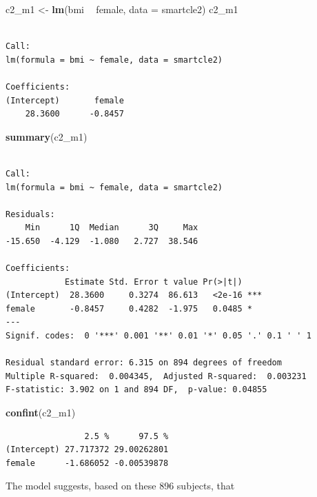 \documentclass[]{book}
\newenvironment{Shaded}{\begin{snugshade}}{\end{snugshade}}
\newcommand{\KeywordTok}[1]{\textcolor[rgb]{0.13,0.29,0.53}{\textbf{#1}}}
\newcommand{\DataTypeTok}[1]{\textcolor[rgb]{0.13,0.29,0.53}{#1}}
\newcommand{\StringTok}[1]{\textcolor[rgb]{0.31,0.60,0.02}{#1}}
\newcommand{\OperatorTok}[1]{\textcolor[rgb]{0.81,0.36,0.00}{\textbf{#1}}}
\newcommand{\NormalTok}[1]{#1}
\theoremstyle{definition}
\theoremstyle{definition}
\theoremstyle{definition}
\theoremstyle{remark}
\begin{document}
\begin{Shaded}
\begin{Highlighting}[]
\NormalTok{c2_m1 <-}\StringTok{ }\KeywordTok{lm}\NormalTok{(bmi }\OperatorTok{~}\StringTok{ }\NormalTok{female, }\DataTypeTok{data =}\NormalTok{ smartcle2)}
\NormalTok{c2_m1}
\end{Highlighting}
\end{Shaded}

\begin{verbatim}

Call:
lm(formula = bmi ~ female, data = smartcle2)

Coefficients:
(Intercept)       female  
    28.3600      -0.8457  
\end{verbatim}

\begin{Shaded}
\begin{Highlighting}[]
\KeywordTok{summary}\NormalTok{(c2_m1)}
\end{Highlighting}
\end{Shaded}

\begin{verbatim}

Call:
lm(formula = bmi ~ female, data = smartcle2)

Residuals:
    Min      1Q  Median      3Q     Max 
-15.650  -4.129  -1.080   2.727  38.546 

Coefficients:
            Estimate Std. Error t value Pr(>|t|)    
(Intercept)  28.3600     0.3274  86.613   <2e-16 ***
female       -0.8457     0.4282  -1.975   0.0485 *  
---
Signif. codes:  0 '***' 0.001 '**' 0.01 '*' 0.05 '.' 0.1 ' ' 1

Residual standard error: 6.315 on 894 degrees of freedom
Multiple R-squared:  0.004345,  Adjusted R-squared:  0.003231 
F-statistic: 3.902 on 1 and 894 DF,  p-value: 0.04855
\end{verbatim}

\begin{Shaded}
\begin{Highlighting}[]
\KeywordTok{confint}\NormalTok{(c2_m1)}
\end{Highlighting}
\end{Shaded}

\begin{verbatim}
                2.5 %      97.5 %
(Intercept) 27.717372 29.00262801
female      -1.686052 -0.00539878
\end{verbatim}

The model suggests, based on these 896 subjects, that
\end{document}
